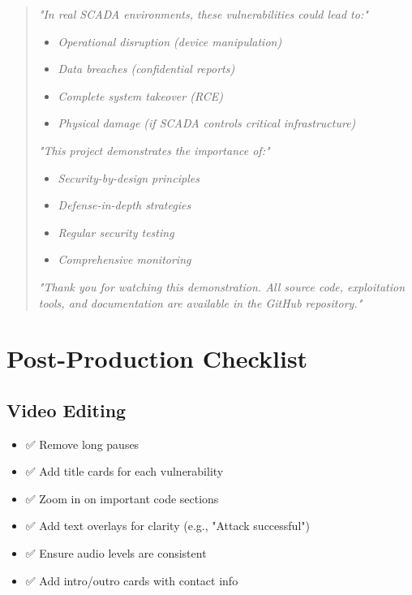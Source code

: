 \documentclass[12pt,a4paper]{article}
\begin{document}
\begin{quote}
\textit{"In real SCADA environments, these vulnerabilities could lead to:"}
\begin{itemize}
    \item \textit{Operational disruption (device manipulation)}
    \item \textit{Data breaches (confidential reports)}
    \item \textit{Complete system takeover (RCE)}
    \item \textit{Physical damage (if SCADA controls critical infrastructure)}
\end{itemize}

\textit{"This project demonstrates the importance of:"}
\begin{itemize}
    \item \textit{Security-by-design principles}
    \item \textit{Defense-in-depth strategies}
    \item \textit{Regular security testing}
    \item \textit{Comprehensive monitoring}
\end{itemize}

\textit{"Thank you for watching this demonstration. All source code, exploitation tools, and documentation are available in the GitHub repository."}
\end{quote}

\newpage
\section{Post-Production Checklist}

\subsection{Video Editing}

\begin{itemize}[leftmargin=*]
    \item ✅ Remove long pauses
    \item ✅ Add title cards for each vulnerability
    \item ✅ Zoom in on important code sections
    \item ✅ Add text overlays for clarity (e.g., "Attack successful")
    \item ✅ Ensure audio levels are consistent
    \item ✅ Add intro/outro cards with contact info
\end{itemize}
\end{document}
